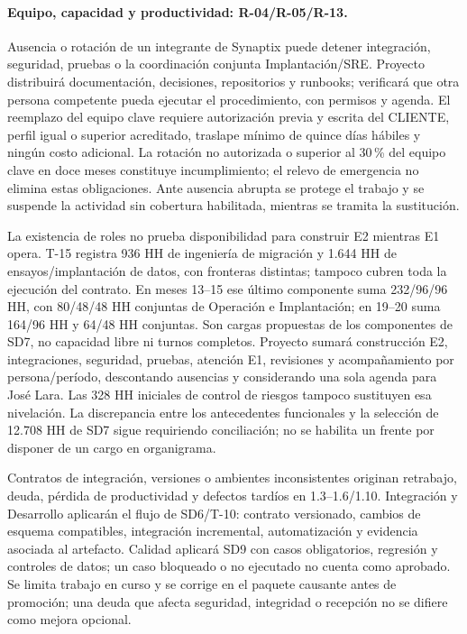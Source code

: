 \paragraph{Equipo, capacidad y productividad: R-04/R-05/R-13.}
Ausencia o rotación de un integrante de Synaptix puede detener integración, seguridad, pruebas o la coordinación conjunta Implantación/SRE. Proyecto distribuirá documentación, decisiones, repositorios y runbooks; verificará que otra persona competente pueda ejecutar el procedimiento, con permisos y agenda. El reemplazo del equipo clave requiere autorización previa y escrita del CLIENTE, perfil igual o superior acreditado, traslape mínimo de quince días hábiles y ningún costo adicional. La rotación no autorizada o superior al 30\,\% del equipo clave en doce meses constituye incumplimiento; el relevo de emergencia no elimina estas obligaciones. Ante ausencia abrupta se protege el trabajo y se suspende la actividad sin cobertura habilitada, mientras se tramita la sustitución. \parencite[art.~76; p.~39]{sd8-ba}

La existencia de roles no prueba disponibilidad para construir E2 mientras E1 opera. T-15 registra 936 HH de ingeniería de migración y 1.644 HH de ensayos/implantación de datos, con fronteras distintas; tampoco cubren toda la ejecución del contrato. En meses 13--15 ese último componente suma 232/96/96 HH, con 80/48/48 HH conjuntas de Operación e Implantación; en 19--20 suma 164/96 HH y 64/48 HH conjuntas. Son cargas propuestas de los componentes de SD7, no capacidad libre ni turnos completos. Proyecto sumará construcción E2, integraciones, seguridad, pruebas, atención E1, revisiones y acompañamiento por persona/período, descontando ausencias y considerando una sola agenda para José Lara. Las 328 HH iniciales de control de riesgos tampoco sustituyen esa nivelación. La discrepancia entre los antecedentes funcionales y la selección de 12.708 HH de SD7 sigue requiriendo conciliación; no se habilita un frente por disponer de un cargo en organigrama.

Contratos de integración, versiones o ambientes inconsistentes originan retrabajo, deuda, pérdida de productividad y defectos tardíos en 1.3--1.6/1.10. Integración y Desarrollo aplicarán el flujo de SD6/T-10: contrato versionado, cambios de esquema compatibles, integración incremental, automatización y evidencia asociada al artefacto. Calidad aplicará SD9 con casos obligatorios, regresión y controles de datos; un caso bloqueado o no ejecutado no cuenta como aprobado. Se limita trabajo en curso y se corrige en el paquete causante antes de promoción; una deuda que afecta seguridad, integridad o recepción no se difiere como mejora opcional. \parencite[19.2; cap.~20; pp.~33--35]{sd8-bt}

